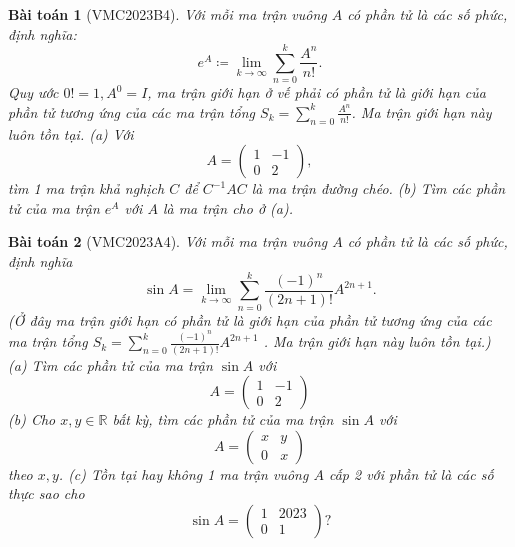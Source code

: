 \documentclass{article}
\newtheorem{baitoan}{Bài toán}
\begin{document}
\begin{baitoan}[VMC2023B4]
	Với mỗi ma trận vuông $A$ có phần tử là các số phức, định nghĩa:
	\begin{equation*}
		e^A\coloneqq\lim_{k\to\infty} \sum_{n=0}^k \frac{A^n}{n!}.
	\end{equation*}
	Quy ước $0! = 1,A^0 = I$, ma trận giới hạn ở vế phải có phần tử là giới hạn của phần tử tương ứng của các ma trận tổng $S_k = \sum_{n=0}^k \frac{A^n}{n!}$. Ma trận giới hạn này luôn tồn tại. (a) Với
	\begin{equation*}
		A = \begin{pmatrix}
			1 & -1\\0 & 2
		\end{pmatrix},
	\end{equation*}
	tìm 1 ma trận khả nghịch $C$ để $C^{-1}AC$ là ma trận đường chéo. (b) Tìm các phần tử của ma trận $e^A$ với $A$ là ma trận cho ở (a).
\end{baitoan}

\begin{baitoan}[VMC2023A4]
	Với mỗi ma trận vuông $A$ có phần tử là các số phức, định nghĩa
	\begin{equation*}
		\sin A = \lim_{k\to\infty} \sum_{n=0}^k \frac{(-1)^n}{(2n + 1)!}A^{2n + 1}.
	\end{equation*}
	(Ở đây ma trận giới hạn có phần tử là giới hạn của phần tử tương ứng của các ma trận tổng $S_k = \sum_{n=0}^k \frac{(-1)^n}{(2n + 1)!}A^{2n + 1}$ . Ma trận giới hạn này luôn tồn tại.) (a) Tìm các phần tử của ma trận $\sin A$ với
	\begin{equation*}
		A = \begin{pmatrix}
			1 & -1\\0 & 2
		\end{pmatrix}
	\end{equation*}
	(b) Cho $x,y\in\mathbb{R}$ bất kỳ, tìm các phần tử của ma trận $\sin A$ với
	\begin{equation*}
		A = \begin{pmatrix}
			x & y\\0 & x
		\end{pmatrix}
	\end{equation*}
	theo $x,y$. (c) Tồn tại hay không 1 ma trận vuông $A$ cấp 2 với phần tử là các số thực sao cho
	\begin{equation*}
		\sin A = \begin{pmatrix}
			1 & 2023\\0 & 1
		\end{pmatrix}?
	\end{equation*}
\end{baitoan}
\end{document}
